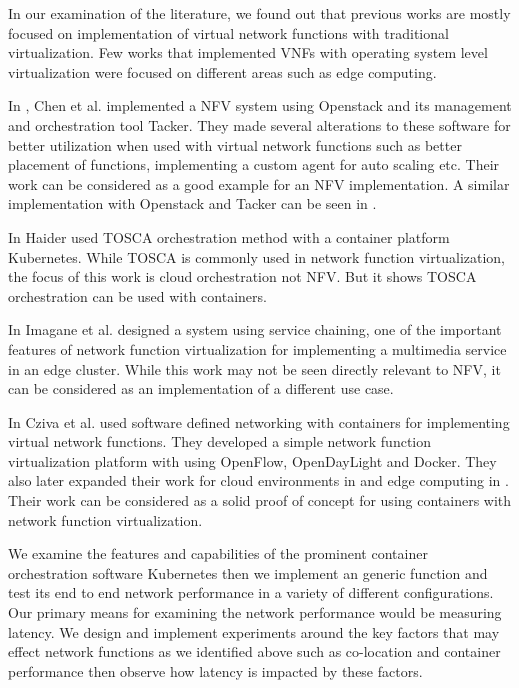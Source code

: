 \documentclass[12pt,oneandhalf,chaparabic,ceng,ms,eng,oneside,pntc]{gsufbe}
\begin{document}
In our examination of the literature, we found out that previous works are mostly focused on
implementation of virtual network functions with traditional virtualization.  Few works that implemented
VNFs with operating system level virtualization were focused on different areas such as edge 
computing.

In \cite{chen_implementing_2017}, Chen et al.  implemented a NFV system using Openstack and its
management and orchestration tool Tacker.  They made several alterations to these software for better
utilization when used with virtual network functions such as better placement of functions, implementing
a custom agent for auto scaling etc.  Their work can be considered as a good example for an NFV
implementation.  A similar implementation with Openstack and Tacker can be seen in \cite{tahir_master}.

In \cite{haider_md_rezzakul_deployment_2017} Haider used TOSCA orchestration method with a container
platform Kubernetes.  While TOSCA is commonly used in network function virtualization, the focus of this
work is cloud orchestration not NFV.  But it shows TOSCA orchestration can be used with containers.

In \cite{imagane_performance_2018} Imagane et al.  designed a system using service chaining, one of the
important features of network function virtualization for implementing a multimedia service in an edge
cluster.  While this work may not be seen directly relevant to NFV, it can be considered as an
implementation of a different use case.

In \cite{cziva_container-based_2015} Cziva et al.  used software defined networking with containers for
implementing virtual network functions.  They developed a simple network function virtualization platform
with using OpenFlow, OpenDayLight and Docker.  They also later expanded their work for cloud environments
in \cite{cziva_gnfc_2015} and edge computing in \cite{cziva_container_2017}.  Their work can be 
considered as a solid proof of concept for using containers with network function virtualization.

We examine the features and capabilities of the prominent
container orchestration software Kubernetes then we implement an generic function and test its
end to end network performance in a variety of different configurations. Our primary means for examining
the network performance would be measuring latency. We design and implement experiments around the key 
factors that may effect network functions as we identified above such as co-location and container 
performance then observe how latency is impacted by these factors.
\end{document}
